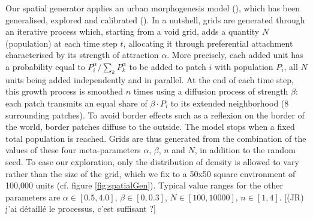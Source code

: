 \documentclass[Afour,sageh,times]{sagej}
\begin{document}
Our spatial generator applies an urban morphogenesis model (\cite{Batty2007}), which has been generalised, explored and calibrated (\cite{Raimbault2014}). In a nutshell, grids are generated through an iterative process which, starting from a void grid, adds a quantity $N$ (population) at each time step $t$, allocating it through preferential attachment  characterised by its strength of attraction $\alpha$. More precisely, each added unit has a probability equal to $P_i^{\alpha}/\sum_k P_k^{\alpha}$ to be added to patch $i$ with population $P_i$, all $N$ units being added independently and in parallel. At the end of each time step, this growth process is smoothed $n$ times using a diffusion process of strength $\beta$: each patch transmits an equal share of $\beta\cdot P_i$ to its extended neighborhood (8 surrounding patches). To avoid border effects such as a reflexion on the border of the world, border patches diffuse to the outside. The model stops when a fixed total population  is reached. Grids are thus generated from the combination of the values of these four meta-parameters $\alpha$, $\beta$, $n$ and $N$, in addition to the random seed. To ease our exploration, only the distribution of density is allowed to vary rather than the size of the grid, which we fix to a 50x50 square environment of 100,000 units (cf. figure \ref{fig:spatialGen}). Typical value ranges for the other parameters are $\alpha\in\left[0.5,4.0\right]$, $\beta \in\left[0,0.3\right] $, $N\in \left[100,10000\right]$, $n\in\left[1,4\right]$.
[(JR) j'ai détaillé le processus, c'est suffisant ?] 
\end{document}
